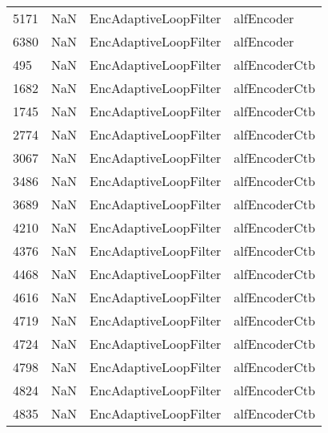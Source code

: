 \begin{tabular}{llll}
5171 &                   NaN &      EncAdaptiveLoopFilter &                                alfEncoder \\
6380 &                   NaN &      EncAdaptiveLoopFilter &                                alfEncoder \\
495  &                   NaN &      EncAdaptiveLoopFilter &                             alfEncoderCtb \\
1682 &                   NaN &      EncAdaptiveLoopFilter &                             alfEncoderCtb \\
1745 &                   NaN &      EncAdaptiveLoopFilter &                             alfEncoderCtb \\
2774 &                   NaN &      EncAdaptiveLoopFilter &                             alfEncoderCtb \\
3067 &                   NaN &      EncAdaptiveLoopFilter &                             alfEncoderCtb \\
3486 &                   NaN &      EncAdaptiveLoopFilter &                             alfEncoderCtb \\
3689 &                   NaN &      EncAdaptiveLoopFilter &                             alfEncoderCtb \\
4210 &                   NaN &      EncAdaptiveLoopFilter &                             alfEncoderCtb \\
4376 &                   NaN &      EncAdaptiveLoopFilter &                             alfEncoderCtb \\
4468 &                   NaN &      EncAdaptiveLoopFilter &                             alfEncoderCtb \\
4616 &                   NaN &      EncAdaptiveLoopFilter &                             alfEncoderCtb \\
4719 &                   NaN &      EncAdaptiveLoopFilter &                             alfEncoderCtb \\
4724 &                   NaN &      EncAdaptiveLoopFilter &                             alfEncoderCtb \\
4798 &                   NaN &      EncAdaptiveLoopFilter &                             alfEncoderCtb \\
4824 &                   NaN &      EncAdaptiveLoopFilter &                             alfEncoderCtb \\
4835 &                   NaN &      EncAdaptiveLoopFilter &                             alfEncoderCtb \\

\end{tabular}
